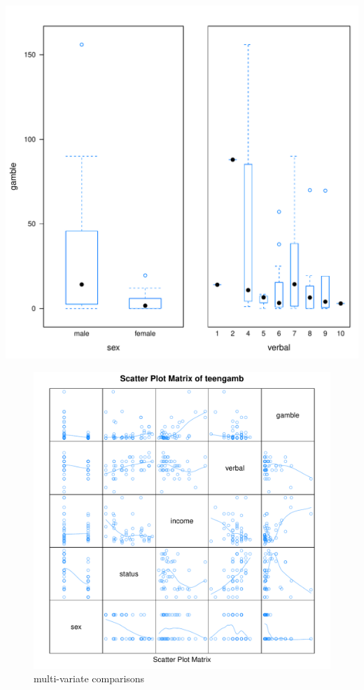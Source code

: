 \documentclass{article}\usepackage[]{graphicx}\usepackage[]{color}
\makeatletter
\def\maxwidth{ %
  \ifdim\Gin@nat@width>\linewidth
    \linewidth
  \else
    \Gin@nat@width
  \fi
}
\newenvironment{knitrout}{}{} %
\makeatother
\begin{document}
\begin{knitrout}
\color{fgcolor}
\includegraphics[width=\maxwidth]{figure/plot_objects-1} 

\end{knitrout}


\begin{knitrout}
\color{fgcolor}\begin{figure}
\includegraphics[width=\maxwidth]{figure/splom-1} \caption[multi-variate comparisons]{multi-variate comparisons}\label{fig:splom}
\end{figure}


\end{knitrout}
\end{document}
